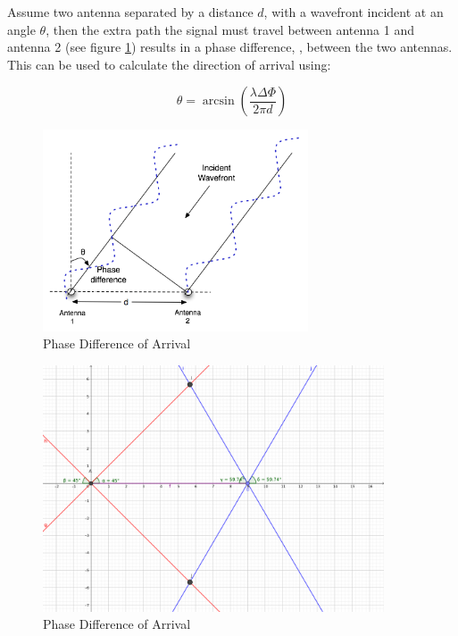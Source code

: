 \documentclass[\main/main.tex]{subfiles}
\begin{document}
Assume two antenna separated by a distance $d$, with a wavefront incident at an angle $\theta$, then the extra path the signal must travel between antenna 1 and antenna 2 (see figure \ref{fig:PhaseInterferometry}) results in a phase difference, \Delta\Phi, between the two antennas. This can be used to calculate the direction of arrival using:

\begin{equation}
    \theta = \arcsin(\frac{\lambda\Delta\Phi}{2\pi d})
\end{equation}

\begin{figure}[H]
    \centering
    \includegraphics[width=0.7\textwidth]{PhaseInterferometry.png}
    \caption{Phase Difference of Arrival}
    \label{fig:PhaseInterferometry}
\end{figure}

\begin{figure}[H]
    \centering
    \includegraphics[width=0.9\textwidth]{pdoa.png}
    \caption{Phase Difference of Arrival}
    \label{fig:pdoa}
\end{figure}
\end{document}
